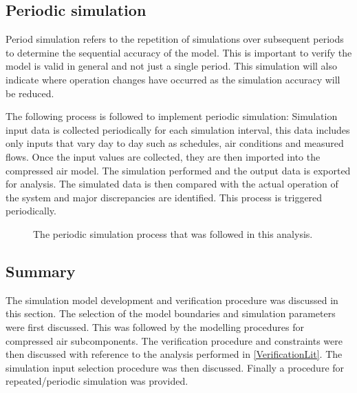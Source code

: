 	\subsection{Periodic simulation}	
		Period simulation refers to the repetition of simulations over subsequent periods to determine the sequential accuracy of the model.  This is important to verify the model is valid in general and not just a single period.  This simulation will also indicate where operation changes have occurred as the simulation accuracy will be reduced.
		\par 
		The following process is followed to implement periodic simulation: Simulation input data is collected periodically for each simulation interval, this data includes only inputs that vary day to day such as schedules, air conditions and  measured flows. Once the input values are collected, they are then imported into the compressed air model. The simulation performed and the output data is exported for analysis. The  simulated data is then compared with the actual operation of the system and major discrepancies are identified. This process is triggered periodically.
		\begin{figure}[h]
			\centering
			\caption{The periodic simulation process that was followed in this analysis.}
			\label{fig: PeriodicProcess}
		\end{figure}
	
	\subsection{Summary}	
The simulation model development and verification procedure was discussed in this section. The selection of the model boundaries and simulation parameters were first discussed. This was followed by the modelling procedures for compressed air subcomponents. The verification procedure and constraints were then discussed with reference to the analysis performed in \cref{VerificationLit}. The simulation input selection procedure was then discussed. Finally a procedure for repeated/periodic simulation was provided.
